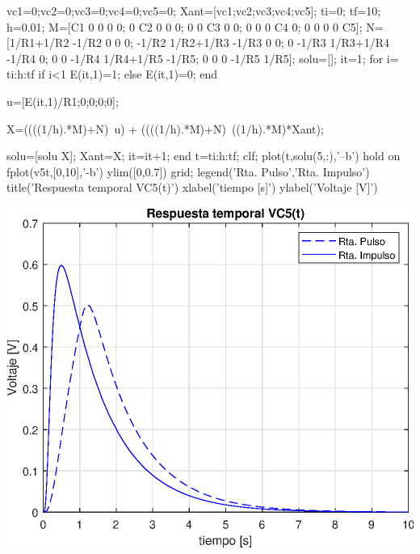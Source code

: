 \documentclass[10pt,a4paper]{article} %
\begin{document}
	\begin{matlabcode}
	vc1=0;vc2=0;vc3=0;vc4=0;vc5=0;
	Xant=[vc1;vc2;vc3;vc4;vc5];
	ti=0;
	tf=10;
	h=0.01;
	M=[C1 0 0 0 0; 0 C2 0 0 0; 0 0 C3 0 0; 0 0 0 C4 0; 0 0 0 0 C5];
	N=[1/R1+1/R2 -1/R2 0 0 0; -1/R2 1/R2+1/R3 -1/R3 0 0; 0 -1/R3 1/R3+1/R4 -1/R4 0; 0 0 -1/R4 1/R4+1/R5 -1/R5; 0 0 0 -1/R5 1/R5];
	solu=[];
	it=1;
	for i= ti:h:tf
	if i<1
	E(it,1)=1;
	else
	E(it,1)=0;
	end
	
	u=[E(it,1)/R1;0;0;0;0];
	
	X=((((1/h).*M)+N)\ u) + ((((1/h).*M)+N)\ ((1/h).*M)*Xant);
	
	solu=[solu X];
	Xant=X;
	it=it+1;
	end
	t=ti:h:tf;
	clf;
	plot(t,solu(5,:),'--b')
	hold on
	fplot(v5t,[0,10],'-b')
	ylim([0,0.7])
	grid;
	legend({'Rta. Pulso','Rta. Impulso'})
	title('Respuesta temporal VC5(t)')
	xlabel('tiempo [s]')
	ylabel('Voltaje [V]')
	\end{matlabcode}
	\begin{center}
	\includegraphics[width=\maxwidth{56.196688409433015em}]{figure_0_09}
	\end{center}
\end{document}
